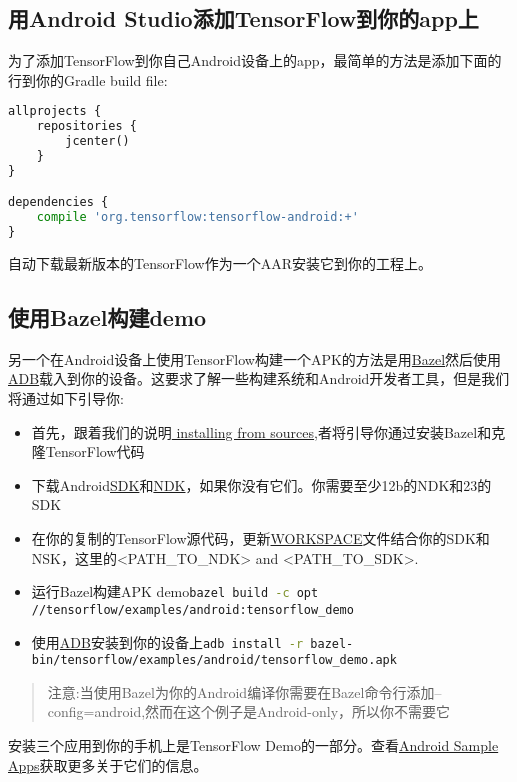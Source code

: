 \subsection{用Android Studio添加TensorFlow到你的app上}
为了添加TensorFlow到你自己Android设备上的app，最简单的方法是添加下面的行到你的Gradle build file:
\begin{lstlisting}[language=Python]
allprojects {
    repositories {
        jcenter()
    }
}

dependencies {
    compile 'org.tensorflow:tensorflow-android:+'
}

\end{lstlisting}
自动下载最新版本的TensorFlow作为一个AAR安装它到你的工程上。
\subsection{使用Bazel构建demo}\label{subseq:Bazel构建}
另一个在Android设备上使用TensorFlow构建一个APK的方法是用\href{https://bazel.build/}{Bazel}然后使用\href{https://developer.android.com/studio/command-line/adb.html?hl=zh-cn}{ADB}载入到你的设备。这要求了解一些构建系统和Android开发者工具，但是我们将通过如下引导你:
\begin{itemize}
\item 首先，跟着我们的说明\href{https://www.tensorflow.org/install/install_sources?hl=zh-cn}{ installing from sources},者将引导你通过安装Bazel和克隆TensorFlow代码
\item 下载Android\href{https://developer.android.com/studio/index.html?hl=zh-cn}{SDK}和\href{https://developer.android.com/ndk/downloads/index.html?hl=zh-cn}{NDK}，如果你没有它们。你需要至少12b的NDK和23的SDK
\item 在你的复制的TensorFlow源代码，更新\href{https://github.com/tensorflow/tensorflow/blob/master/WORKSPACE}{WORKSPACE}文件结合你的SDK和NSK，这里的<PATH\_TO\_NDK> and <PATH\_TO\_SDK>.
\item 运行Bazel构建APK demo\lstinline[language=Bash]{bazel build -c opt //tensorflow/examples/android:tensorflow_demo}
\item 使用\href{https://developer.android.com/studio/command-line/adb.html?hl=zh-cn#move}{ADB}安装到你的设备上\lstinline[language=Bash]{adb install -r bazel-bin/tensorflow/examples/android/tensorflow_demo.apk}
\end{itemize}
\begin{quote}
注意:当使用Bazel为你的Android编译你需要在Bazel命令行添加--config=android,然而在这个例子是Android-only，所以你不需要它
\end{quote}
安装三个应用到你的手机上是TensorFlow Demo的一部分。查看\href{https://www.tensorflow.org/mobile/android_build?hl=zh-cn#android_sample_apps}{Android Sample Apps}获取更多关于它们的信息。
